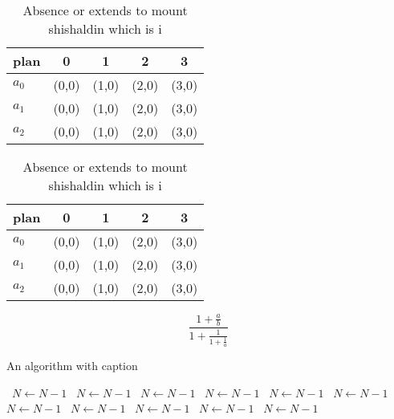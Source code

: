\documentclass[a4paper]{article}
\begin{document}
\begin{table}
\begin{adjustbox}{width=0.6\columnwidth}
\begin{tabular}{|l|l|l|l|l|}
\hline
\textbf{plan} & \multicolumn{1}{c|}{\textbf{0}} & \multicolumn{1}{c|}{\textbf{1}} & \multicolumn{1}{c|}{\textbf{2}} & \multicolumn{1}{c|}{\textbf{3}} \\ \hline
\textbf{$a_0$}  & (0,0) & (1,0) & (2,0) & (3,0) \\ \hline
\textbf{$a_1$}  & (0,0) & (1,0) & (2,0) & (3,0) \\ \hline
\textbf{$a_2$}  & (0,0) & (1,0) & (2,0) & (3,0) \\ \hline
\end{tabular}
\end{adjustbox}
\caption{Absence or extends to mount shishaldin which is i
}
\end{table}

\begin{table}
\begin{adjustbox}{width=0.6\columnwidth}
\begin{tabular}{|l|l|l|l|l|}
\hline
\textbf{plan} & \multicolumn{1}{c|}{\textbf{0}} & \multicolumn{1}{c|}{\textbf{1}} & \multicolumn{1}{c|}{\textbf{2}} & \multicolumn{1}{c|}{\textbf{3}} \\ \hline
\textbf{$a_0$}  & (0,0) & (1,0) & (2,0) & (3,0) \\ \hline
\textbf{$a_1$}  & (0,0) & (1,0) & (2,0) & (3,0) \\ \hline
\textbf{$a_2$}  & (0,0) & (1,0) & (2,0) & (3,0) \\ \hline
\end{tabular}
\end{adjustbox}
\caption{Absence or extends to mount shishaldin which is i
}
\end{table}

\[ \frac{1+\frac{a}{b}}{1+\frac{1}{1+\frac{1}{a}}} \]

\begin{algorithm}
\caption{An algorithm with caption}
\begin{algorithmic}
\    \State $N \gets N - 1$
\    \State $N \gets N - 1$
\    \State $N \gets N - 1$
\    \State $N \gets N - 1$
\    \State $N \gets N - 1$
\    \State $N \gets N - 1$
\    \State $N \gets N - 1$
\    \State $N \gets N - 1$
\    \State $N \gets N - 1$
\    \State $N \gets N - 1$
\    \State $N \gets N - 1$
\EndWhile
\end{algorithmic}
\end{algorithm}
\end{document}
